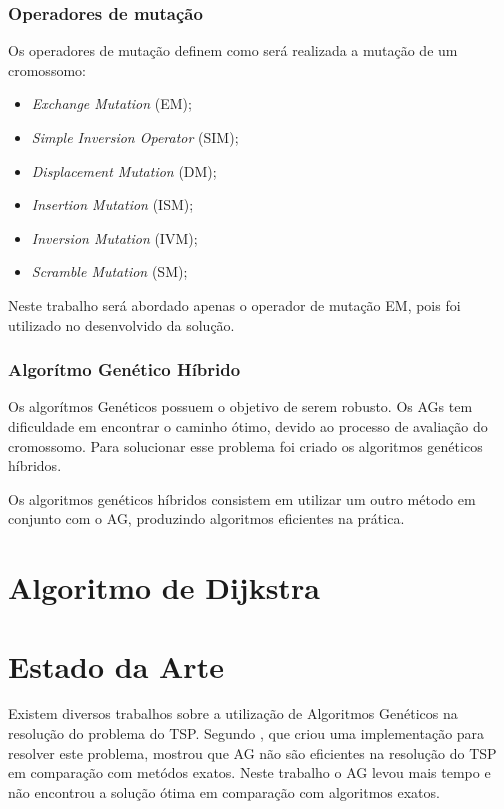 \documentclass{abnt}
\begin{document}
		\subsection{Operadores de mutação}

			Os operadores de mutação definem como será realizada a mutação de um cromossomo\cite{0012-pdf}:

			\begin{itemize}
				\item \textit{Exchange Mutation} (EM);
				\item \textit{Simple Inversion Operator} (SIM);
				\item \textit{Displacement Mutation} (DM);
				\item \textit{Insertion Mutation} (ISM);
				\item \textit{Inversion Mutation} (IVM);
				\item \textit{Scramble Mutation} (SM);
			\end{itemize}

			Neste trabalho será abordado apenas o operador de mutação EM, pois foi utilizado no desenvolvido da solução.


		\subsection{Algorítmo Genético Híbrido}

			Os algorítmos  Genéticos possuem o objetivo de serem robusto. Os AGs tem dificuldade em encontrar o caminho ótimo, devido ao processo de avaliação do cromossomo. 
			Para solucionar esse problema foi criado os algoritmos genéticos híbridos.

			Os algoritmos genéticos híbridos consistem em utilizar um outro método em conjunto com o AG, produzindo algoritmos eficientes na prática.

		\chapter{Algoritmo de Dijkstra}



		\chapter{Estado da Arte}
		
			Existem diversos trabalhos sobre a utilização de Algoritmos Genéticos na resolução do problema do TSP.
			Segundo \cite{0005-pdf}, que criou uma implementação para resolver este problema, mostrou que AG não são eficientes 
			na resolução do TSP em comparação com metódos exatos. Neste trabalho o AG levou mais tempo e não encontrou a solução ótima em comparação com 
			algoritmos exatos.
\end{document}
